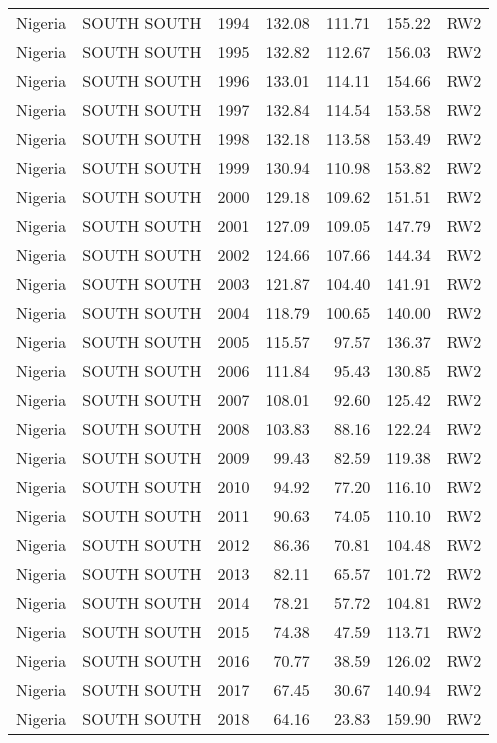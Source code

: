 \begin{longtable}{lllrrrl}
  Nigeria & SOUTH SOUTH & 1994 & 132.08 & 111.71 & 155.22 & RW2 \\ 
  Nigeria & SOUTH SOUTH & 1995 & 132.82 & 112.67 & 156.03 & RW2 \\ 
  Nigeria & SOUTH SOUTH & 1996 & 133.01 & 114.11 & 154.66 & RW2 \\ 
  Nigeria & SOUTH SOUTH & 1997 & 132.84 & 114.54 & 153.58 & RW2 \\ 
  Nigeria & SOUTH SOUTH & 1998 & 132.18 & 113.58 & 153.49 & RW2 \\ 
  Nigeria & SOUTH SOUTH & 1999 & 130.94 & 110.98 & 153.82 & RW2 \\ 
  Nigeria & SOUTH SOUTH & 2000 & 129.18 & 109.62 & 151.51 & RW2 \\ 
  Nigeria & SOUTH SOUTH & 2001 & 127.09 & 109.05 & 147.79 & RW2 \\ 
  Nigeria & SOUTH SOUTH & 2002 & 124.66 & 107.66 & 144.34 & RW2 \\ 
  Nigeria & SOUTH SOUTH & 2003 & 121.87 & 104.40 & 141.91 & RW2 \\ 
  Nigeria & SOUTH SOUTH & 2004 & 118.79 & 100.65 & 140.00 & RW2 \\ 
  Nigeria & SOUTH SOUTH & 2005 & 115.57 & 97.57 & 136.37 & RW2 \\ 
  Nigeria & SOUTH SOUTH & 2006 & 111.84 & 95.43 & 130.85 & RW2 \\ 
  Nigeria & SOUTH SOUTH & 2007 & 108.01 & 92.60 & 125.42 & RW2 \\ 
  Nigeria & SOUTH SOUTH & 2008 & 103.83 & 88.16 & 122.24 & RW2 \\ 
  Nigeria & SOUTH SOUTH & 2009 & 99.43 & 82.59 & 119.38 & RW2 \\ 
  Nigeria & SOUTH SOUTH & 2010 & 94.92 & 77.20 & 116.10 & RW2 \\ 
  Nigeria & SOUTH SOUTH & 2011 & 90.63 & 74.05 & 110.10 & RW2 \\ 
  Nigeria & SOUTH SOUTH & 2012 & 86.36 & 70.81 & 104.48 & RW2 \\ 
  Nigeria & SOUTH SOUTH & 2013 & 82.11 & 65.57 & 101.72 & RW2 \\ 
  Nigeria & SOUTH SOUTH & 2014 & 78.21 & 57.72 & 104.81 & RW2 \\ 
  Nigeria & SOUTH SOUTH & 2015 & 74.38 & 47.59 & 113.71 & RW2 \\ 
  Nigeria & SOUTH SOUTH & 2016 & 70.77 & 38.59 & 126.02 & RW2 \\ 
  Nigeria & SOUTH SOUTH & 2017 & 67.45 & 30.67 & 140.94 & RW2 \\ 
  Nigeria & SOUTH SOUTH & 2018 & 64.16 & 23.83 & 159.90 & RW2 \\ 

\end{longtable}
